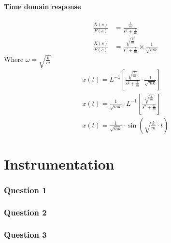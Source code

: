 \documentclass[12pt]{article}
\numberwithin{equation}{section}
\begin{document}
\subsection*{Time domain response}
\begin{align}
  \frac{X(s)}{F(s)} &= \frac{\frac{1}{m}}{s^2 + \frac{k}{m}}\\
  \frac{X(s)}{F(s)} &= \frac{\sqrt{\frac{k}{m}}}{s^2 + \frac{k}{m}} \times \frac{1}{\sqrt{mk}}
\end{align}
Where $\omega = \sqrt{\frac{k}{m}}$
\begin{align}
  x(t) = L^{-1} \left[ \frac{\sqrt{\frac{k}{m}}}{s^2 + \frac{k}{m}} \cdot \frac{1}{\sqrt{mk}} \right]\\
  x(t) = \frac{1}{\sqrt{mk}} \cdot L^{-1} \left[ \frac{\sqrt{\frac{k}{m}}}{s^2 + \frac{k}{m}} \right]\\
  x(t) = \frac{1}{\sqrt{mk}} \cdot \sin{\left(\sqrt{\frac{k}{m}}\cdot t\right)}
\end{align}
\part{Instrumentation}
\section{Question 1}
\section{Question 2}
\section{Question 3}
\end{document}

